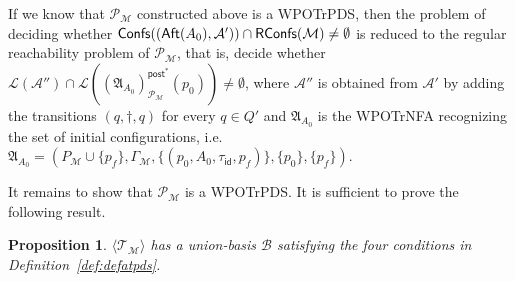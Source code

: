 \documentclass[preprint,12pt]{elsarticle}
\newtheorem{proposition}[theorem]{Proposition}
\newcommand\Aa{{\mathcal{A} }}
\newcommand\Mm{{\mathcal{M} }}
\newcommand\Pp{{\mathcal{P} }}
\newcommand\act{{\sf Act}}
\newcommand\aft{{\sf Aft}}
\newcommand\confs{{\mathsf{Confs} }}
\newcommand\post{{\mathsf{post} }}
\newcommand\RConfs{\mathsf{RConfs}}
\newcommand{\id}{\mathsf{id}}
\newcommand\Aut{{\mathfrak{A} }}
\newcommand\AutB{{\mathfrak{B} }}
\newcommand\Lang{{\mathscr{L} }}
\newcommand\TranSet{{\mathscr{T} }}
\newcommand\Tranbasis{{\mathscr{B} }}
\newcommand\ConfSet{{\mathscr{C} }}
\newcommand{\WOTrPDS}{\textsf{WPOTrPDS}}
\newcommand{\WOTrNFA}{\textsf{WPOTrNFA}}
\newcommand{\NFA}{\textsf{NFA}}
\newcommand{\zhilin}[1]{\color{blue} {ZL: #1 :LZ} \color{black}}
\newcommand{\zhilin}[1]{}
\begin{document}


If we know that $\Pp_\Mm$ constructed above is a {\WOTrPDS}, then the problem of deciding whether $\confs((\aft(A_0), \Aa')) \cap \RConfs(\Mm) \neq \emptyset$ is reduced to the regular reachability problem of $\Pp_\Mm$, that is, decide whether $\Lang(\Aa'')  \cap \Lang((\Aut_{A_0})^{\post^*}_{\Pp_{\Mm}}(p_0)) \neq \emptyset$, where $\Aa''$ is obtained from $\Aa'$ by adding the transitions $(q, \dag, q)$ for every $q \in Q'$ and $\Aut_{A_0}$ is the {\WOTrNFA} recognizing the set of initial configurations, i.e. $\Aut_{A_0} = (P_\Mm \cup \{p_f\}, \Gamma_{\Mm}, \{(p_0, A_0, \tau_{\id}, p_f)\}, \{p_0\}, \{p_f\})$. 



It remains to show that $\Pp_\Mm$ is a {\WOTrPDS}. It is sufficient to prove the following result. 

\begin{proposition}\label{lem-transet-wo}
$\langle \TranSet_\Mm \rangle$ has a union-basis $\Tranbasis$ satisfying the four conditions in Definition~\ref{def:defatpds}.
\end{proposition}


\end{document}
